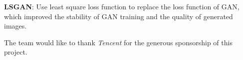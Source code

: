 \textbf{LSGAN}: Use least square loss function to replace the loss function of GAN, which improved the stability of GAN training and the quality of generated images.

The team would like to thank \emph{Tencent} for the generous sponsorship of this project.

\endinput




